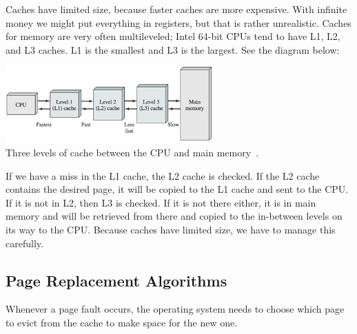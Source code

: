 Caches have limited size, because faster caches are more expensive. With infinite money we might put everything in registers, but that is rather unrealistic. Caches for memory are very often multileveled; Intel 64-bit CPUs tend to have L1, L2, and L3 caches. L1 is the smallest and L3 is the largest. See the diagram below:

\begin{center}
\includegraphics[width=0.6\textwidth]{images/caches.png}\\
Three levels of cache between the CPU and main memory~\cite{osi}.
\end{center}

If we have a miss in the L1 cache, the L2 cache is checked. If the L2 cache contains the desired page, it will be copied to the L1 cache and sent to the CPU. If it is not in L2, then L3 is checked. If it is not there either, it is in main memory and will be retrieved from there and copied to the in-between levels on its way to the CPU. Because caches have limited size, we have to manage this carefully.

\subsection*{Page Replacement Algorithms}
Whenever a page fault occurs, the operating system needs to choose which page to evict from the cache to make space for the new one. 



